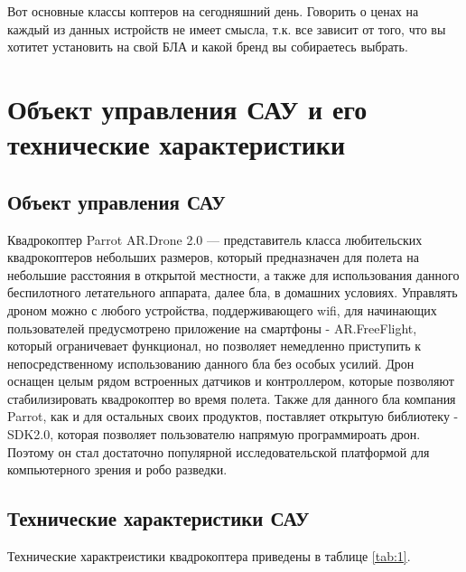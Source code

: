 Вот основные классы коптеров на сегодняшний день. Говорить о ценах на каждый из данных истройств не имеет смысла, т.к. все зависит от того, что вы хотитет установить на свой БЛА и какой бренд вы собираетесь выбрать.\cite{geek}

\section{Объект управления САУ и его технические
характеристики}

\subsection{Объект управления САУ}
Квадрокоптер Parrot AR.Drone 2.0 — представитель класса любительских квадрокоптеров небольших размеров, который предназначен для полета на небольшие расстояния в открытой местности, а также для использования данного беспилотного летательного аппарата, далее бла, в домашних условиях. Управлять дроном можно с любого устройства, поддерживающего wifi, для начинающих пользователей предусмотрено приложение на смартфоны - AR.FreeFlight, который ограничевает функционал, но позволяет немедленно приступить к непосредственному использованию данного бла без особых усилий. Дрон оснащен целым рядом встроенных датчиков и контроллером, которые позволяют стабилизировать квадрокоптер во время полета. Также для данного бла компания Parrot, как и для остальных своих продуктов, поставляет открытую библиотеку - SDK2.0, которая позволяет пользователю напрямую программироать дрон. Поэтому он стал достаточно популярной исследовательской платформой для компьютерного зрения и робо разведки.

\subsection{Технические характеристики САУ}

Технические характреистики квадрокоптера приведены в таблице \ref{tab:1}.\cite{Gurg}\cite{xak}\cite{Thes1}

